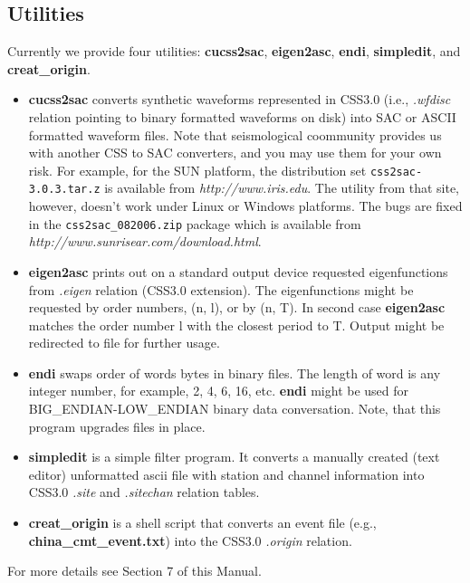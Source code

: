\documentclass[11pt]{article}
\begin{document}
\subsection{Utilities}
Currently we provide four utilities: {\bf cucss2sac}, {\bf eigen2asc},
{\bf endi}, {\bf simpledit}, and {\bf creat\_origin}.
%
\begin{itemize}
\item {\bf cucss2sac} converts synthetic waveforms represented in CSS3.0 
  (i.e., {\it .wfdisc} relation pointing to binary formatted waveforms on disk) 
  into SAC or ASCII formatted waveform files. Note that seismological coommunity provides us
  with another CSS to SAC converters, and you may use them for your own risk. For example,
  for the SUN platform, the distribution set
  {\tt css2sac-3.0.3.tar.z} is 
  available from {\it http://www.iris.edu}. The utility from that
  site, however,  doesn't work under Linux or Windows platforms. 
  The bugs are fixed in the {\tt css2sac\_082006.zip} package which is 
  available from {\it http://www.sunrisear.com/download.html}.
\item{\bf eigen2asc} prints out on a standard output device  requested 
  eigenfunctions from {\it .eigen} relation (CSS3.0 extension). 
  The eigenfunctions might be requested by order numbers, (n, l), or by 
  (n, T). In second case {\bf eigen2asc} matches the
  order number l with the closest period to T. Output might be redirected 
  to file for further usage.
\item  {\bf endi} swaps order of words bytes in binary files. The length
  of word is any integer number, for example, 2, 4, 6, 16, etc. 
  {\bf endi} might be used for BIG\_ENDIAN-LOW\_ENDIAN
  binary data conversation. Note, that this program upgrades files in place.
\item  {\bf simpledit} is a simple filter program. It converts a manually 
  created (text editor) unformatted ascii file with station and
  channel information into CSS3.0 {\it .site} and {\it .sitechan} relation
  tables.
\item {\bf creat\_origin} is a shell script  that converts an event 
  file (e.g., {\bf china\_cmt\_event.txt}) into the CSS3.0 {\it .origin} 
  relation.
\end{itemize}
For more details see Section 7 of this Manual.
\end{document}
